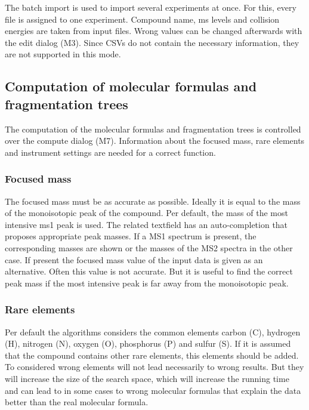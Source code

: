 \documentclass[a4paper,11pt]{article}
\begin{document}
 The batch import is used to import several experiments at once. For this, every file is assigned to one experiment. 
 Compound name, ms levels and collision energies are taken from input files. Wrong values can be changed afterwards with the edit dialog (M3).  
 Since CSVs do not contain the necessary information, they are not supported in this mode.
 
 \subsection{Computation of molecular formulas and fragmentation trees}
 
 The computation of the molecular formulas and fragmentation trees is controlled over the compute dialog (M7). 
 Information about the focused mass, rare elements and instrument settings are needed for a correct function.
 
 \subsubsection{Focused mass}
 
 The focused mass must be as accurate as possible. Ideally it is equal to the mass of the monoisotopic peak of the compound. Per default, 
 the mass of the most intensive ms1 peak is used. The related textfield has an auto-completion that proposes appropriate peak masses. 
 If a MS1 spectrum is present, the corresponding masses are shown or the masses of the MS2 spectra in the other case.  
 If present the focused mass value of the input data is given as an alternative.  Often this value is not accurate. 
 But it is useful to find the correct peak mass if the most intensive peak is far away from the monoisotopic peak.
 
 \subsubsection{Rare elements}
 
 Per default the algorithms considers the common elements carbon (C), hydrogen (H), nitrogen (N), oxygen (O), phosphorus (P) and sulfur (S). 
 If it is assumed that the compound contains other rare elements, this elements should be added. To considered wrong elements will not lead necessarily 
 to wrong results. But they will increase the size of the search space, which will increase the running time and can lead to in some cases 
 to wrong molecular formulas that explain the data better than the real molecular formula.
 
\end{document}
